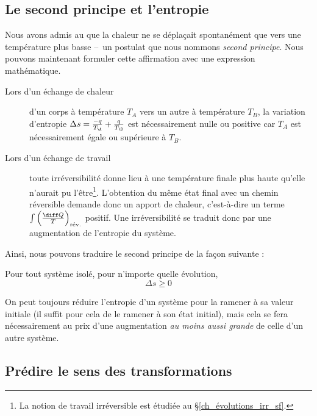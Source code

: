 		

	\subsection{Le second principe et l’entropie}

		Nous avons admis au \courssept que la chaleur ne se déplaçait spontanément que vers une température plus basse --\ un postulat que nous nommons \textit{second principe}. Nous pouvons maintenant formuler cette affirmation avec une expression mathématique.
	
		\begin{description}
			\item[Lors d’un échange de chaleur] d’un corps à température $T_A$ vers un autre à température $T_B$, la variation d’entropie $\Delta s = \frac{-q}{T_\A} + \frac{q}{T_\B }$ est nécessairement nulle ou positive car $T_A$ est nécessairement égale ou supérieure à $T_B$.
			
			\item[Lors d’un échange de travail] toute irréversibilité donne lieu à une température finale plus haute qu’elle n’aurait pu l’être\footnote{La notion de travail irréversible est étudiée au \S\ref{ch_évolutions_irr_sf}.}. L’obtention du même état final avec un chemin réversible demande donc un apport de chaleur, c’est-à-dire un terme $\int \left(\frac{\diff Q}{T}\right)_\text{rév.}$ positif. Une irréversibilité se traduit donc par une augmentation de l’entropie du système.
			
		\end{description}

		Ainsi, nous pouvons traduire le second principe de la façon suivante :
			
		\begin{trucimportant}
			Pour tout système isolé, pour n’importe quelle évolution,
				\begin{equation}
					\Delta s \geqslant 0
					\label{eq_augmentation_entropie}
				\end{equation}
		\end{trucimportant}

		On peut toujours réduire l’entropie d’un système pour la ramener à sa valeur initiale (il suffit pour cela de le ramener à son état initial), mais cela se fera nécessairement au prix d’une augmentation \emph{au moins aussi grande} de celle d’un autre système.


	\subsection{Prédire le sens des transformations}
	
